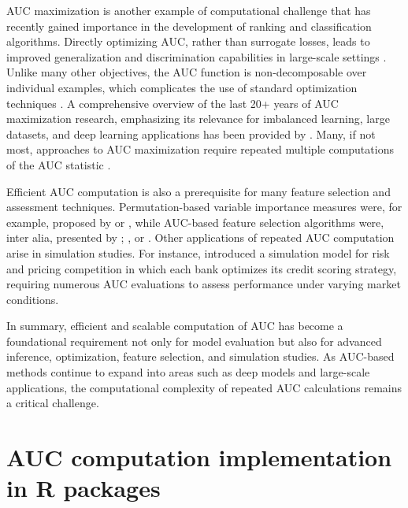 AUC maximization is another example of computational challenge that has
recently gained importance in the development of ranking and
classification algorithms. Directly optimizing AUC, rather than
surrogate losses, leads to improved generalization and discrimination
capabilities in large-scale settings \citep{Yuan_Yan_Sonka_Yang_2021, Zhang_Xu_2022, LeDell_etal_2016}. Unlike many other objectives, the
AUC function is non-decomposable over individual examples, which
complicates the use of standard optimization techniques
\citep{Zhou_Ying_Skiena_2020}. A comprehensive overview of the last 20+ years
of AUC maximization research, emphasizing its relevance for imbalanced
learning, large datasets, and deep learning applications has been
provided by \citet{Yang_Ying_2023}. Many, if not most, approaches to AUC
maximization require repeated multiple computations of the AUC statistic
\citep[see, for example][]{Calders_Jaroszewicz_2007, Yang_Zhou_Lei_Ying_2020, Ataman_Street_Zhang_2006, Gajowniczek_Zabkowski_2021}.

Efficient AUC computation is also a prerequisite for many feature
selection and assessment techniques. Permutation-based variable
importance measures were, for example, proposed by
\citet{Janitza_Strobl_Boulesteix_2013} or \citet{Biecek_2018}, while AUC-based feature
selection algorithms were, inter alia, presented by \citet{Sun_Wang_Wei_2017};
\citet{Su_Du_Wang_Wei_Liu_2022}, \citet{Xu_Suzuki_2014} or \citet{Ribeiro_2021}. Other
applications of repeated AUC computation arise in simulation studies.
For instance, \citet{Kochanski_2021} introduced a simulation model for risk and
pricing competition in which each bank optimizes its credit scoring
strategy, requiring numerous AUC evaluations to assess performance under
varying market conditions.

In summary, efficient and scalable computation of AUC has become a
foundational requirement not only for model evaluation but also for
advanced inference, optimization, feature selection, and simulation
studies. As AUC-based methods continue to expand into areas such as deep
models and large-scale applications, the computational complexity of
repeated AUC calculations remains a critical challenge.

\section{AUC computation implementation in R packages}\label{auc-computation-implementation-in-r-packages}

